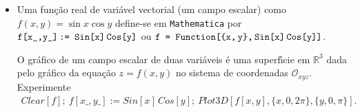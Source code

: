 \documentclass[11pt]{article}
\begin{document}
\begin{itemize}
   
   

     
 
 
     


    
    
 
\item[e)]   Uma fun\c{c}\~ao real de vari\'avel vectorial (um campo escalar) como $f(x,y) = \sin x \cos y$ define-se  em \texttt{Mathematica} por 
$ \texttt{f[x\_,y\_]\,:= Sin[x]\,Cos[y]}$ ou  $\texttt{f = Function[\{x,\,y\},\,Sin[x]\,Cos[y]]}$.

     
 O gr\'afico de um campo escalar de duas vari\'aveis \'e uma superf\'\i cie em $\mathbb{R}^3$ dada pelo gr\'afico da equa\c{c}\~ao $z=f(x,y)$ no sistema de coordenadas $\mathcal{O}_{xyz}$. Experimente 
\[\begin{array}{l}
 Clear[f];  \   f[x\_,y\_] := Sin[x]\,Cos[y]; \
Plot3D[f[x, y], \{x, 0, 2 \pi\}, \{y, 0, \pi\}].
     \end{array} \]
 

\end{itemize}
\end{document}

